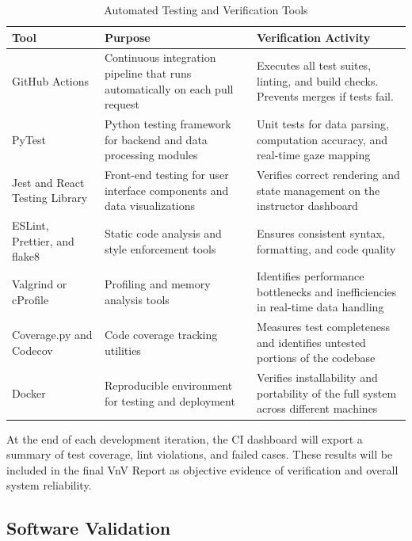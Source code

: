 \documentclass[12pt, titlepage]{article}
\begin{document}
\begin{table}[htbp]
\centering
\caption{Automated Testing and Verification Tools}
\begin{tabularx}{\textwidth}{|p{3cm}|p{4cm}|X|}
\hline
\textbf{Tool} & \textbf{Purpose} & \textbf{Verification Activity} \\
\hline
GitHub Actions & Continuous integration pipeline that runs automatically on each pull request & Executes all test suites, linting, and build checks. Prevents merges if tests fail. \\
\hline
PyTest & Python testing framework for backend and data processing modules & Unit tests for data parsing, computation accuracy, and real-time gaze mapping \\
\hline
Jest and React Testing Library & Front-end testing for user interface components and data visualizations & Verifies correct rendering and state management on the instructor dashboard \\
\hline
ESLint, Prettier, and flake8 & Static code analysis and style enforcement tools & Ensures consistent syntax, formatting, and code quality \\
\hline
Valgrind or cProfile & Profiling and memory analysis tools & Identifies performance bottlenecks and inefficiencies in real-time data handling \\
\hline
Coverage.py and Codecov & Code coverage tracking utilities & Measures test completeness and identifies untested portions of the codebase \\
\hline
Docker & Reproducible environment for testing and deployment & Verifies installability and portability of the full system across different machines \\
\hline
\end{tabularx}
\end{table}

At the end of each development iteration, the CI dashboard will export a summary of test coverage, lint violations, and failed cases. These results will be included in the final VnV Report as objective evidence of verification and overall system reliability.\\

\subsection{Software Validation}

\end{document}
